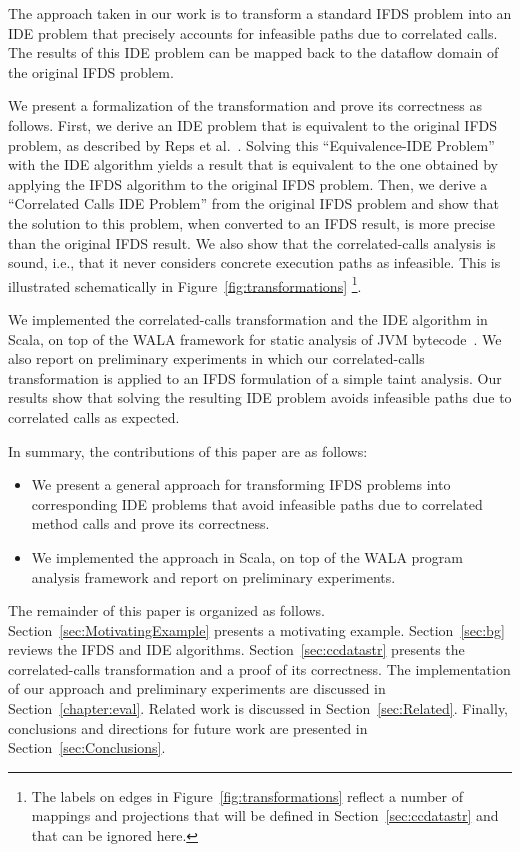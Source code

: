 

The approach taken in our work is to transform a standard IFDS problem into an
IDE problem that precisely accounts for infeasible paths due to correlated calls. 
The results of this IDE problem can be mapped back to the dataflow domain of the 
original IFDS problem.

We present a formalization of the transformation and prove its correctness
as follows. 
First, we derive an IDE problem that is equivalent to the original IFDS problem,
as described by Reps et al.~\cite{sagiv1996precise}.
Solving this ``Equivalence-IDE Problem'' with the IDE algorithm yields a result that
is equivalent to the one obtained by applying the IFDS algorithm to the original IFDS problem.
Then, we derive a ``Correlated Calls 
IDE Problem'' from the original IFDS problem and show 
that the solution to this problem, when converted to an IFDS result, is more precise
than the original IFDS result.
We also show that the correlated-calls analysis is sound, i.e., that it never considers concrete execution paths as infeasible.
This is illustrated schematically
in Figure~\ref{fig:transformations}%
\footnote{ 
  The labels %
  on edges in 
  Figure~\ref{fig:transformations} reflect a number of mappings and projections 
  that will be defined in Section~\ref{sec:ccdatastr} and that can be ignored here.
}.

We implemented the correlated-calls transformation and the IDE algorithm in Scala,
on top of the WALA framework for static analysis of JVM bytecode~\cite{fink2012wala}.
We also report on preliminary experiments in which our correlated-calls transformation
is applied to an IFDS formulation of a simple taint analysis. Our results show that
solving the resulting IDE problem avoids infeasible paths due to correlated calls as
expected.

In summary, the contributions of this paper are as follows:
\begin{itemize}
  \item
    We present a general approach for transforming IFDS problems into corresponding
    IDE problems that avoid infeasible paths due to correlated method calls and
    prove its correctness. 
  \item
    We implemented the approach in Scala, on top of the WALA program analysis framework
    and report on preliminary experiments. 
\end{itemize}

The remainder of this paper is organized as follows.
%
Section~\ref{sec:MotivatingExample} presents a motivating example.
%
Section~\ref{sec:bg} reviews the IFDS and IDE algorithms.
%
Section~\ref{sec:ccdatastr} presents the correlated-calls transformation
and a proof of its correctness.
%
The implementation of our approach and preliminary experiments are discussed
in Section~\ref{chapter:eval}.
%
Related work is discussed in Section~\ref{sec:Related}.
%
Finally, conclusions and directions for future work are presented in Section~\ref{sec:Conclusions}.
 
 
